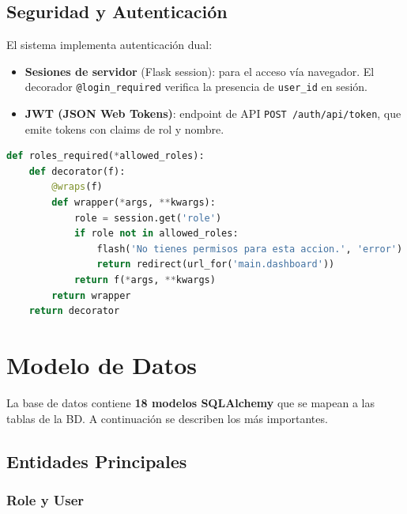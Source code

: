 \documentclass[12pt,a4paper]{article}
\begin{document}
\subsection{Seguridad y Autenticaci\'on}

El sistema implementa autenticaci\'on dual:

\begin{itemize}
  \item \textbf{Sesiones de servidor} (Flask session): para el acceso v\'ia navegador.
    El decorador \texttt{@login\_required} verifica la presencia de \texttt{user\_id}
    en sesi\'on.
  \item \textbf{JWT (JSON Web Tokens)}: endpoint de API
    \texttt{POST /auth/api/token}, que emite tokens con claims de rol y nombre.
\end{itemize}

\begin{lstlisting}[language=Python, caption={Decorador de control de acceso por rol}]
def roles_required(*allowed_roles):
    def decorator(f):
        @wraps(f)
        def wrapper(*args, **kwargs):
            role = session.get('role')
            if role not in allowed_roles:
                flash('No tienes permisos para esta accion.', 'error')
                return redirect(url_for('main.dashboard'))
            return f(*args, **kwargs)
        return wrapper
    return decorator
\end{lstlisting}

\newpage

\section{Modelo de Datos}

La base de datos contiene \textbf{18 modelos SQLAlchemy} que se mapean a las tablas
de la BD. A continuaci\'on se describen los m\'as importantes.

\subsection{Entidades Principales}

\subsubsection{Role y User}
\end{document}
